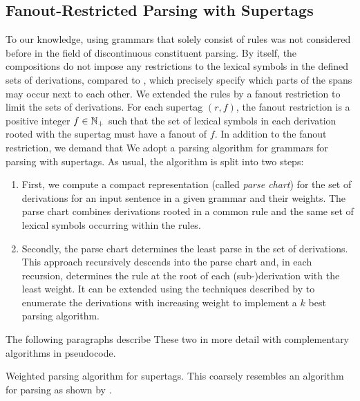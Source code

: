 \documentclass[../../document.tex]{subfiles}
\begin{document}
    \subsection{Fanout-Restricted Parsing with  Supertags}\label{sec:parsing:dcp}
    To our knowledge, using grammars that solely consist of  rules was not considered before in the field of discontinuous constituent parsing.
    By itself, the  compositions do not impose any restrictions to the lexical symbols in the defined sets of derivations, compared to , which precisely specify which parts of the spans may occur next to each other.
    We extended the rules by a fanout restriction to limit the sets of derivations.
    For each  supertag \((r, f)\), the fanout restriction is a positive integer \(f \in \mathbb{N}_+\) such that the set of lexical symbols in each derivation rooted with the supertag must have a fanout of \(f\).
    In addition to the fanout restriction, we demand that
    We adopt a parsing algorithm for  grammars for parsing with  supertags.
    As usual, the algorithm is split into two steps:
    \begin{enumerate}
        \item \label{step:parsing:chart}
            First, we compute a compact representation (called \emph{parse chart}) for the set of derivations for an input sentence in a given grammar and their weights.
            The parse chart combines derivations rooted in a common rule and the same set of lexical symbols occurring within the rules.
        \item \label{step:parsing:derivation}
            Secondly, the parse chart determines the least parse in the set of derivations.
            This approach recursively descends into the parse chart and, in each recursion, determines the rule at the root of each (sub-)derivation with the least weight.
            It can be extended using the techniques described by \citet{HuaChia05} to enumerate the derivations with increasing weight to implement a \(k\) best parsing algorithm.
    \end{enumerate}
    The following paragraphs describe These two in more detail with complementary algorithms in pseudocode.

    \begin{algorithm}
        \caption{\label{alg:parsing:chart}
            Weighted parsing algorithm for  supertags.
            This coarsely resembles an algorithm for parsing  as shown by \citet[the ``na\"ive algorithm'' in Section~3]{Burden05}.
        }
        
    \end{algorithm}
\end{document}
